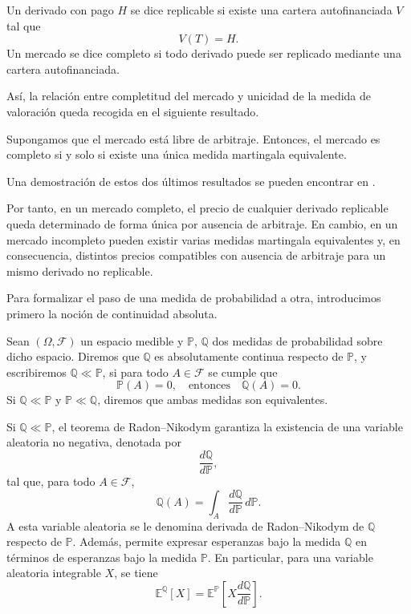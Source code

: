 \begin{definition}
\label{def:derivado-replicable}
Un derivado con pago \(H\) se dice replicable si existe una cartera autofinanciada \(V\) tal que
\[
V(T)=H.
\]
Un mercado se dice completo si todo derivado puede ser replicado mediante una cartera autofinanciada.
\end{definition}

Así, la relación entre completitud del mercado y unicidad de la medida de valoración queda recogida en el siguiente resultado.

\begin{theorem}
\label{th:segundo-teorema-fundamental}
Supongamos que el mercado está libre de arbitraje. Entonces, el mercado es completo si y solo si existe una única medida martingala equivalente.
\end{theorem}


Una demostración de estos dos últimos resultados se pueden encontrar en \cite[pp.92--98]{Capinski2012}. \medskip

Por tanto, en un mercado completo, el precio de cualquier derivado replicable queda determinado de forma única por ausencia de arbitraje. En cambio, en un mercado incompleto pueden existir varias medidas martingala equivalentes y, en consecuencia, distintos precios compatibles con ausencia de arbitraje para un mismo derivado no replicable.

Para formalizar el paso de una medida de probabilidad a otra, introducimos primero la noción de continuidad absoluta.

\begin{definition}
\label{def:continuidad-absoluta}
Sean \((\Omega,\mathcal{F})\) un espacio medible y \(\mathbb{P}\), \(\mathbb{Q}\) dos medidas de probabilidad sobre dicho espacio. Diremos que \(\mathbb{Q}\) es absolutamente continua respecto de \(\mathbb{P}\), y escribiremos \(\mathbb{Q}\ll \mathbb{P}\), si para todo \(A\in\mathcal{F}\) se cumple que
\[
\mathbb{P}(A)=0, \quad \text{entonces} \quad \mathbb{Q}(A)=0.
\]
Si \(\mathbb{Q}\ll \mathbb{P}\) y \(\mathbb{P}\ll \mathbb{Q}\), diremos que ambas medidas son equivalentes.
\end{definition}

Si \(\mathbb{Q}\ll \mathbb{P}\), el teorema de Radon--Nikodym garantiza la existencia de una variable aleatoria no negativa, denotada por
\[
\frac{d\mathbb{Q}}{d\mathbb{P}},
\]
tal que, para todo \(A\in\mathcal{F}\),
\begin{equation}
\label{eq:radon-nikodym}
\mathbb{Q}(A)
=
\int_A \frac{d\mathbb{Q}}{d\mathbb{P}}\,d\mathbb{P}.
\end{equation}
A esta variable aleatoria se le denomina derivada de Radon--Nikodym de \(\mathbb{Q}\) respecto de \(\mathbb{P}\). Además, permite expresar esperanzas bajo la medida \(\mathbb{Q}\) en términos de esperanzas bajo la medida \(\mathbb{P}\). En particular, para una variable aleatoria integrable \(X\), se tiene
\[
\mathbb{E}^{\mathbb{Q}}[X]
=
\mathbb{E}^{\mathbb{P}}
\left[
X\frac{d\mathbb{Q}}{d\mathbb{P}}
\right].
\]

